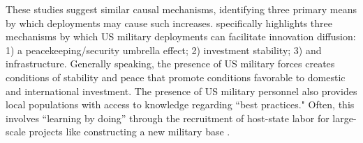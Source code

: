 \documentclass[12pt]{article}
\begin{document}
\begin{doublespace}

These studies suggest similar causal mechanisms, identifying three primary means by which deployments may cause such increases.  specifically highlights three mechanisms by which US military deployments can facilitate innovation diffusion: 1) a peacekeeping/security umbrella effect; 2) investment stability; 3) and infrastructure. Generally speaking, the presence of US military forces creates conditions of stability and peace that promote conditions favorable to domestic and international investment. The presence of US military personnel also provides local populations with access to knowledge regarding ``best practices." Often, this involves ``learning by doing'' through the recruitment of host-state labor for large-scale projects like constructing a new military base \cite[4]{kane2012development}. 


\end{doublespace}
\end{document}

